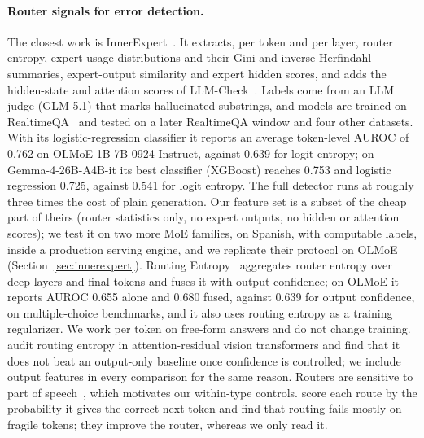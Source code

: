 \documentclass[11pt]{article}
\begin{document}
\paragraph{Router signals for error detection.}
The closest work is InnerExpert~\citep{fonseca2026innerexpert}.
It extracts, per token and per layer, router entropy, expert-usage distributions and their Gini and inverse-Herfindahl summaries, expert-output similarity and expert hidden scores, and adds the hidden-state and attention scores of LLM-Check~\citep{sriramanan2024llmcheck}.
Labels come from an LLM judge (GLM-5.1) that marks hallucinated substrings, and models are trained on RealtimeQA~\citep{kasai2023realtimeqa} and tested on a later RealtimeQA window and four other datasets.
With its logistic-regression classifier it reports an average token-level AUROC of 0.762 on OLMoE-1B-7B-0924-Instruct, against 0.639 for logit entropy; on Gemma-4-26B-A4B-it its best classifier (XGBoost) reaches 0.753 and logistic regression 0.725, against 0.541 for logit entropy.
The full detector runs at roughly three times the cost of plain generation.
Our feature set is a subset of the cheap part of theirs (router statistics only, no expert outputs, no hidden or attention scores); we test it on two more MoE families, on Spanish, with computable labels, inside a production serving engine, and we replicate their protocol on OLMoE (Section~\ref{sec:innerexpert}).
Routing Entropy~\citep{li2026routing} aggregates router entropy over deep layers and final tokens and fuses it with output confidence; on OLMoE it reports AUROC 0.655 alone and 0.680 fused, against 0.639 for output confidence, on multiple-choice benchmarks, and it also uses routing entropy as a training regularizer.
We work per token on free-form answers and do not change training.
\citet{liang2026auditing} audit routing entropy in attention-residual vision transformers and find that it does not beat an output-only baseline once confidence is controlled; we include output features in every comparison for the same reason.
Routers are sensitive to part of speech~\citep{antoine2025pos}, which motivates our within-type controls.
\citet{yoon2026misrouted} score each route by the probability it gives the correct next token and find that routing fails mostly on fragile tokens; they improve the router, whereas we only read it.
\end{document}
